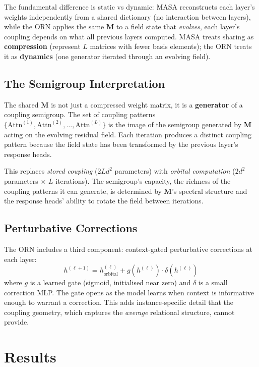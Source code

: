 \documentclass[11pt, a4paper]{article}
\newcommand{\M}{\mathbf{M}}
\theoremstyle{plain}
\theoremstyle{remark}
\begin{document}
The fundamental difference is static vs dynamic: MASA reconstructs each layer's weights independently from a shared dictionary (no interaction between layers), while the ORN applies the same $\M$ to a field state that \emph{evolves}, each layer's coupling depends on what all previous layers computed.
MASA treats sharing as \textbf{compression} (represent $L$ matrices with fewer basis elements); the ORN treats it as \textbf{dynamics} (one generator iterated through an evolving field).

\subsection{The Semigroup Interpretation}

The shared $\M$ is not just a compressed weight matrix, it is a \textbf{generator} of a coupling semigroup.
The set of coupling patterns $\{\text{Attn}^{(1)}, \text{Attn}^{(2)}, \ldots, \text{Attn}^{(L)}\}$ is the image of the semigroup generated by $\M$ acting on the evolving residual field.
Each iteration produces a distinct coupling pattern because the field state has been transformed by the previous layer's response heads.

This replaces \emph{stored coupling} ($2Ld^2$ parameters) with \emph{orbital computation} ($2d^2$ parameters $\times$ $L$ iterations).
The semigroup's capacity, the richness of the coupling patterns it can generate, is determined by $\M$'s spectral structure and the response heads' ability to rotate the field between iterations.

\subsection{Perturbative Corrections}

The ORN includes a third component: context-gated perturbative corrections at each layer:
\begin{equation}
    h^{(\ell+1)} = h^{(\ell)}_{\text{orbital}} + g(h^{(\ell)}) \cdot \delta(h^{(\ell)})
\end{equation}
where $g$ is a learned gate (sigmoid, initialised near zero) and $\delta$ is a small correction MLP.
The gate opens as the model learns when context is informative enough to warrant a correction.
This adds instance-specific detail that the coupling geometry, which captures the \emph{average} relational structure, cannot provide.

\section{Results}
\end{document}
